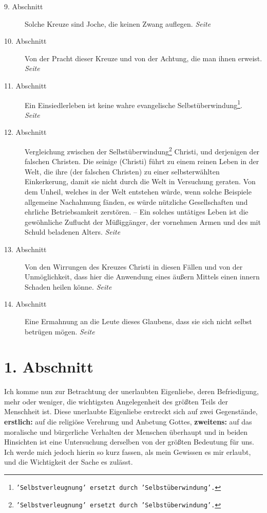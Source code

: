 \begin{description}
\item[9. Abschnitt] Solche Kreuze sind Joche, die keinen Zwang auflegen.
\dotfill \textit{Seite~\pageref{kap5_ab9}}\\
\item[10. Abschnitt] Von der Pracht dieser Kreuze und von der Achtung, die man
ihnen erweist.
\dotfill \textit{Seite~\pageref{kap5_ab10}}\\
\item[11. Abschnitt] Ein Einsiedlerleben ist keine wahre evangelische
Selbstüberwindung\footnote{\texttt{'Selbstverleugnung' ersetzt durch
'Selbstüberwindung'.}}.
\dotfill \textit{Seite~\pageref{kap5_ab11}}\\
\item[12. Abschnitt] Vergleichung zwischen der
Selbstüberwindung\footnote{\texttt{'Selbstverleugnung' ersetzt durch
'Selbstüberwindung'.}} Christi, und
derjenigen der falschen Christen. Die seinige (Christi) führt zu einem reinen
Leben in
der Welt, die ihre (der falschen Christen) zu einer selbsterwählten
Einkerkerung, damit sie nicht
durch die Welt in Versuchung geraten. Von dem Unheil, welches in der Welt
entstehen würde, wenn solche Beispiele allgemeine Nachahmung fänden, es würde
nützliche Gesellschaften und ehrliche Betriebsamkeit zerstören. -- Ein solches
untätiges Leben ist die gewöhnliche Zuflucht der Müßiggänger, der vornehmen
Armen und des mit Schuld beladenen Alters.
\dotfill \textit{Seite~\pageref{kap5_ab12}}\\
\item[13. Abschnitt] Von den Wirrungen des Kreuzes Christi in diesen Fällen und
von der Unmöglichkeit, dass hier die Anwendung eines äußern Mittels einen innern
Schaden heilen könne.
\dotfill \textit{Seite~\pageref{kap5_ab13}}\\
\item[14. Abschnitt] Eine Ermahnung an die Leute dieses Glaubens, dass sie sich
nicht selbst betrügen mögen.
\dotfill \textit{Seite~\pageref{kap5_ab14}}\\

\end{description}

\newpage

\section{1. Abschnitt} \label{kap5_ab1}

Ich komme nun zur Betrachtung der unerlaubten Eigenliebe, deren Befriedigung,
mehr oder weniger, die wichtigsten Angelegenheit des größten Teils der
Menschheit ist. Diese unerlaubte Eigenliebe erstreckt sich auf zwei Gegenstände,
\textbf{erstlich:} auf die religiöse Verehrung und Anbetung Gottes,
\textbf{zweitens:} auf das
moralische und bürgerliche Verhalten der Menschen überhaupt und in beiden
Hinsichten ist eine Untersuchung derselben von der größten Bedeutung für uns.
Ich werde mich jedoch hierin so kurz fassen, als mein Gewissen es mir erlaubt,
und die Wichtigkeit der Sache es zulässt.

